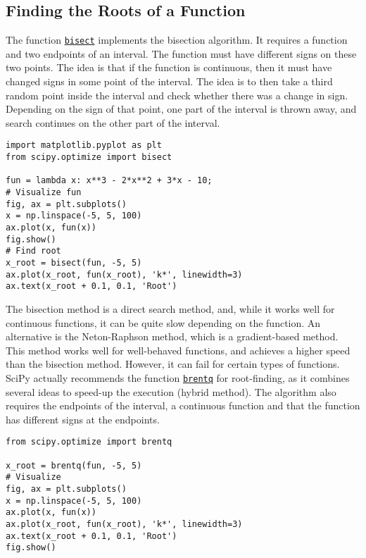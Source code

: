 \documentclass[12pt, a4paper]{article}
\begin{document}
\subsection{Finding the Roots of a Function}
\label{sec:org5a822f6}
The function \href{https://docs.scipy.org/doc/scipy-1.3.0/reference/generated/scipy.optimize.bisect.html?\#scipy-optimize-bisect}{\texttt{bisect}} implements the bisection algorithm.
It requires a function and two endpoints of an interval.
The function must have different signs on these two points.
The idea is that if the function is continuous, then it must have changed signs in some point of the interval.
The idea is to then take a third random point inside the interval and check whether there was a change in sign.
Depending on the sign of that point, one part of the interval is thrown away, and search continues on the other part of the interval.
\lstset{language=jupyter-python,label= ,caption= ,captionpos=b,numbers=none}
\begin{lstlisting}
import matplotlib.pyplot as plt
from scipy.optimize import bisect

fun = lambda x: x**3 - 2*x**2 + 3*x - 10;
# Visualize fun
fig, ax = plt.subplots()
x = np.linspace(-5, 5, 100)
ax.plot(x, fun(x))
fig.show()
# Find root
x_root = bisect(fun, -5, 5)
ax.plot(x_root, fun(x_root), 'k*', linewidth=3)
ax.text(x_root + 0.1, 0.1, 'Root')
\end{lstlisting}

The bisection method is a direct search method, and, while it works well for continuous functions, it can be quite slow depending on the function.
An alternative is the Neton-Raphson method, which is a gradient-based method.
This method works well for well-behaved functions, and achieves a higher speed than the bisection method.
However, it can fail for certain types of functions.
SciPy actually recommends the function \href{https://docs.scipy.org/doc/scipy-1.3.0/reference/generated/scipy.optimize.brentq.html\#scipy-optimize-brentq}{\texttt{brentq}} for root-finding, as it combines several ideas to speed-up the execution (hybrid method).
The algorithm also requires the endpoints of the interval, a continuous function and that the function has different signs at the endpoints.
\lstset{language=jupyter-python,label= ,caption= ,captionpos=b,numbers=none}
\begin{lstlisting}
from scipy.optimize import brentq

x_root = brentq(fun, -5, 5)
# Visualize
fig, ax = plt.subplots()
x = np.linspace(-5, 5, 100)
ax.plot(x, fun(x))
ax.plot(x_root, fun(x_root), 'k*', linewidth=3)
ax.text(x_root + 0.1, 0.1, 'Root')
fig.show()
\end{lstlisting}
\end{document}
